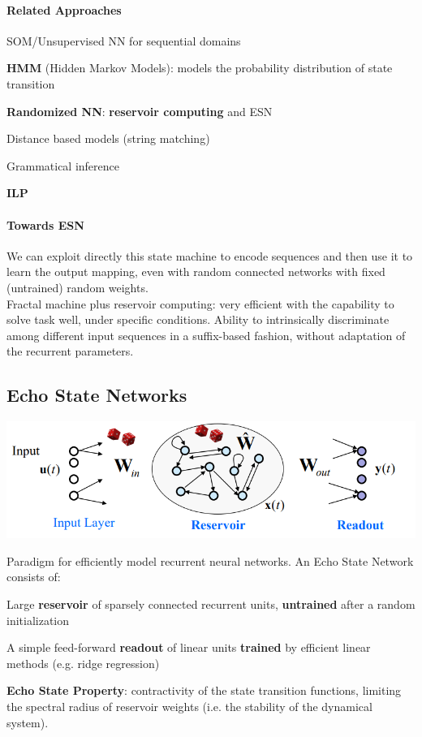 \documentclass[10pt]{report}
\begin{document}
\paragraph{Related Approaches} \begin{list}{}{}
	\item SOM/Unsupervised NN for sequential domains
	\item \textbf{HMM} (Hidden Markov Models): models the probability distribution of state transition
	\item \textbf{Randomized NN}: \textbf{reservoir computing} and ESN
	\item Distance based models (string matching)
	\item Grammatical inference
	\item \textbf{ILP}
\end{list}
\paragraph{Towards ESN} We can exploit directly this state machine to encode sequences and then use it to learn the output mapping, even with random connected networks with fixed (untrained) random weights.\\
Fractal machine plus reservoir computing: very efficient with the capability to solve task well, under specific conditions. Ability to intrinsically discriminate among different input sequences in a suffix-based fashion, without adaptation of the recurrent parameters.
\subsection{Echo State Networks}
\begin{center}
	\includegraphics[scale=0.5]{39.png}
\end{center}
Paradigm for efficiently model recurrent neural networks. An Echo State Network consists of:
\begin{list}{}{}
	\item Large \textbf{reservoir} of sparsely connected recurrent units, \textbf{untrained} after a random initialization
	\item A simple feed-forward \textbf{readout} of linear units \textbf{trained} by efficient linear methods (e.g. ridge regression)
\end{list}
\textbf{Echo State Property}: contractivity of the state transition functions, limiting the spectral radius of reservoir weights (i.e. the stability of the dynamical system).
\end{document}

